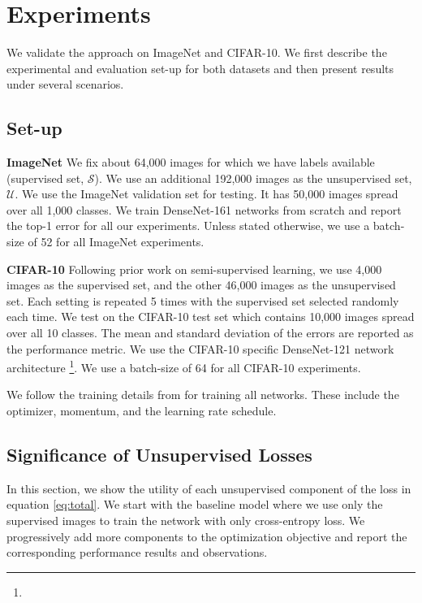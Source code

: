\section{Experiments}
\label{sec:experiments}

We validate the approach on ImageNet and CIFAR-10. We first describe the experimental and evaluation
set-up for both datasets and then present results under several scenarios.

\subsection{Set-up}
\textbf{ImageNet} We fix about 64,000 images for which
we have labels available (supervised set, $\mathcal{S}$). We use an additional 192,000 images as the
unsupervised set, $\mathcal{U}$. We use the ImageNet validation set for testing. It has 50,000
images spread over all 1,000 classes. We train DenseNet-161 networks from scratch and report the
top-1 error for all our experiments. Unless stated otherwise, we use a batch-size of 52 for all
ImageNet experiments. %


\textbf{CIFAR-10} Following prior work on semi-supervised learning, we use 4,000
images as the supervised set, and the other 46,000 images as the unsupervised set. Each setting
is repeated 5 times with the supervised set selected randomly each time. We test on the CIFAR-10
test set which contains 10,000 images spread over all 10 classes. The mean and standard
deviation of the errors are reported as the performance metric. We use the CIFAR-10 specific
DenseNet-121 network architecture \footnote{}. We use a batch-size of 64 for all CIFAR-10
experiments.

We follow the training details from \cite{densenet} for training all networks. These include
the optimizer, momentum, and the learning rate schedule.

\subsection{Significance of Unsupervised Losses}
In this section, we show the utility of each unsupervised component of the loss in equation
\ref{eq:total}. We start with the baseline model where we use only the supervised images to train
the network with only cross-entropy loss. We progressively add more components to the optimization
objective and report the corresponding performance results and observations.

